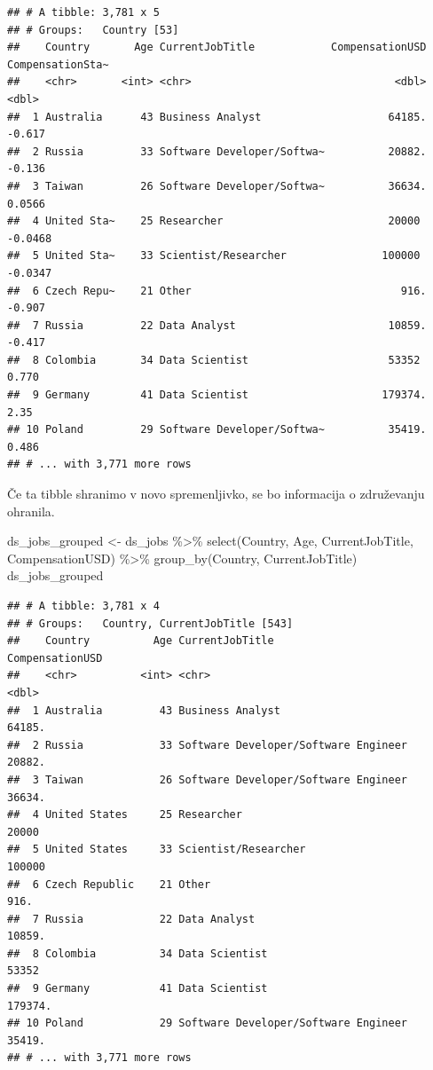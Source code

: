 \documentclass[
]{book}
\newenvironment{Shaded}{\begin{snugshade}}{\end{snugshade}}
\newcommand{\FunctionTok}[1]{\textcolor[rgb]{0.00,0.00,0.00}{#1}}
\newcommand{\NormalTok}[1]{#1}
\newcommand{\OtherTok}[1]{\textcolor[rgb]{0.56,0.35,0.01}{#1}}
\newcommand{\SpecialCharTok}[1]{\textcolor[rgb]{0.00,0.00,0.00}{#1}}
\begin{document}
\begin{verbatim}
## # A tibble: 3,781 x 5
## # Groups:   Country [53]
##    Country       Age CurrentJobTitle            CompensationUSD CompensationSta~
##    <chr>       <int> <chr>                                <dbl>            <dbl>
##  1 Australia      43 Business Analyst                    64185.          -0.617 
##  2 Russia         33 Software Developer/Softwa~          20882.          -0.136 
##  3 Taiwan         26 Software Developer/Softwa~          36634.           0.0566
##  4 United Sta~    25 Researcher                          20000           -0.0468
##  5 United Sta~    33 Scientist/Researcher               100000           -0.0347
##  6 Czech Repu~    21 Other                                 916.          -0.907 
##  7 Russia         22 Data Analyst                        10859.          -0.417 
##  8 Colombia       34 Data Scientist                      53352            0.770 
##  9 Germany        41 Data Scientist                     179374.           2.35  
## 10 Poland         29 Software Developer/Softwa~          35419.           0.486 
## # ... with 3,771 more rows
\end{verbatim}

Če ta tibble shranimo v novo spremenljivko, se bo informacija o združevanju ohranila.

\begin{Shaded}
\begin{Highlighting}[]
\NormalTok{ds\_jobs\_grouped }\OtherTok{\textless{}{-}}\NormalTok{ ds\_jobs }\SpecialCharTok{\%\textgreater{}\%}
  \FunctionTok{select}\NormalTok{(Country, Age, CurrentJobTitle, CompensationUSD) }\SpecialCharTok{\%\textgreater{}\%}
  \FunctionTok{group\_by}\NormalTok{(Country, CurrentJobTitle)}
\NormalTok{ds\_jobs\_grouped}
\end{Highlighting}
\end{Shaded}

\begin{verbatim}
## # A tibble: 3,781 x 4
## # Groups:   Country, CurrentJobTitle [543]
##    Country          Age CurrentJobTitle                      CompensationUSD
##    <chr>          <int> <chr>                                          <dbl>
##  1 Australia         43 Business Analyst                              64185.
##  2 Russia            33 Software Developer/Software Engineer          20882.
##  3 Taiwan            26 Software Developer/Software Engineer          36634.
##  4 United States     25 Researcher                                    20000 
##  5 United States     33 Scientist/Researcher                         100000 
##  6 Czech Republic    21 Other                                           916.
##  7 Russia            22 Data Analyst                                  10859.
##  8 Colombia          34 Data Scientist                                53352 
##  9 Germany           41 Data Scientist                               179374.
## 10 Poland            29 Software Developer/Software Engineer          35419.
## # ... with 3,771 more rows
\end{verbatim}
\end{document}
